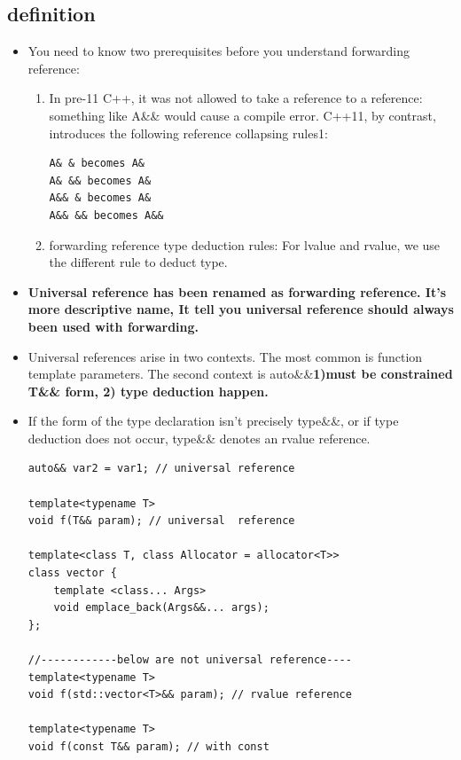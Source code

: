 \documentclass[a4paper,11pt,twoside]{book}
\begin{document}
\subsection{definition}
\begin{itemize}
\item You need to know two prerequisites before you understand forwarding reference:

\begin{enumerate}
	\item In pre-11 C++, it was not allowed to take a reference to a reference: something like A\&\& would cause a compile error. C++11, by contrast, introduces the following reference collapsing rules1:
	
\begin{lstlisting}[numbers=none]
A& & becomes A&
A& && becomes A&
A&& & becomes A&
A&& && becomes A&&
\end{lstlisting}
	
	\item forwarding reference type deduction rules: For lvalue and rvalue, we use the different rule to deduct type.
\end{enumerate}

\item \textbf{Universal reference has been renamed as forwarding reference. It's more descriptive name, It tell you universal reference should always been used with forwarding.}

\item  Universal references arise in two contexts. The most common is function template parameters. The second context is auto\&\&\textbf{1)must be constrained T\&\& form, 2) type deduction happen.}

\item If the form of the type declaration isn't precisely type\&\&, or if type deduction does not occur, type\&\& denotes an rvalue reference.
\begin{lstlisting}
auto&& var2 = var1; // universal reference

template<typename T>
void f(T&& param); // universal  reference

template<class T, class Allocator = allocator<T>>
class vector {
	template <class... Args>
	void emplace_back(Args&&... args);  
};

//------------below are not universal reference----
template<typename T>
void f(std::vector<T>&& param); // rvalue reference

template<typename T>
void f(const T&& param); // with const


\end{lstlisting}
\end{itemize}
\end{document}
